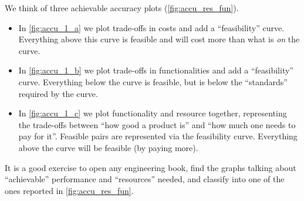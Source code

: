 \begin{figure*}[h]
    \centering
    \hfill
    \hfill
    \hfill
    \caption{}
\end{figure*}

\begin{figure*}[b]
    \centering
    \caption{}
    \label{fig:accu_res_fun}
\end{figure*}

We think of three achievable accuracy plots (\cref{fig:accu_res_fun}).

\begin{itemize}
    \item
          In \cref{fig:accu_1_a} we plot trade-offs in costs and add a ``feasibility'' curve.
          Everything above this curve is feasible and will cost more than what is \emph{on} the curve.
    \item
          In \cref{fig:accu_1_b} we plot trade-offs in functionalities and add a ``feasibility'' curve.
          Everything below the curve is feasible, but is below the ``standards'' required by the curve.
    \item
          In \cref{fig:accu_1_c} we plot functionality and resource together, representing the trade-offs between ``how good a product is'' and ``how much one needs to pay for it''.
          Feasible pairs are represented via the feasibility curve.
          Everything above the curve will be feasible (by paying more).
\end{itemize}

It is a good exercise to open any engineering book, find the graphs talking about ``achievable'' performance and ``resources'' needed, and classify into one of the ones reported in \cref{fig:accu_res_fun}.


